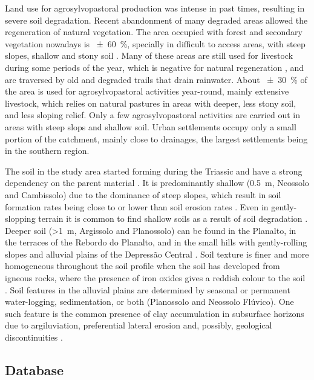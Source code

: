 Land use for agrosylvopastoral production was intense in past times, resulting in severe soil 
degradation. Recent abandonment of many degraded areas allowed the regeneration of natural 
vegetation. The area occupied with forest and secondary vegetation nowadays is \SI{\pm60}{\percent},
specially in difficult to access areas, with steep slopes, shallow and stony soil 
\citep{SamuelRosaEtAl2011a}. Many of these areas are still used for livestock during some periods of
the year, which is negative for natural regeneration \cite{ScheneiderEtAl1978, HackEtAl2005}, and 
are traversed by old and degraded trails that drain rainwater. About \SI{\pm30}{\percent} of the 
area is used for agrosylvopastoral activities year-round, mainly extensive livestock, which relies 
on natural pastures in areas with deeper, less stony soil, and less sloping relief. Only a few 
agrosylvopastoral activities are carried out in areas with steep slops and shallow soil. Urban
settlements occupy only a small portion of the catchment, mainly close to drainages, the largest
settlements being in the southern region.

The soil in the study area started forming during the Triassic and have a strong dependency on the 
parent material \citep{NascimentoEtAl2010}. It is predominantly shallow (\SI{0.5}{\metre}, Neossolo 
and Cambissolo) due to the dominance of steep slopes, which result in soil formation rates being 
close to or lower than soil erosion rates \citep{DalmolinEtAl2006a}. Even in gently-slopping terrain
it is common to find shallow soils as a result of soil degradation \citep{Moser1990, MouraBueno2012}.
Deeper soil (\SI{>1}{\metre}, Argissolo and Planossolo) can be found in the Planalto, in the 
terraces of the Rebordo do Planalto, and in the small hills with gently-rolling slopes and alluvial 
plains of the Depressão Central \citep{Moser1990, MiguelEtAl2012}. Soil texture is finer and more 
homogeneous throughout the soil profile when the soil has developed from igneous rocks, where the 
presence of iron oxides gives a reddish colour to the soil \citep{MiguelEtAl2012}. Soil features in 
the alluvial plains are determined by seasonal or permanent water-logging, sedimentation, or both 
(Planossolo and Neossolo Flúvico). One such feature is the common presence of clay accumulation in
subsurface horizons due to argiluviation, preferential lateral erosion and, possibly, geological
discontinuities \citep{PieriniEtAl2002, MiguelEtAl2012}.

\subsection{Database}
\label{sec:intro-database}

